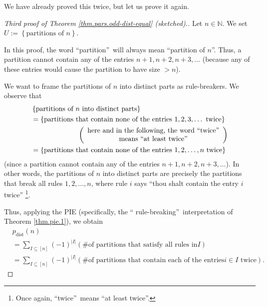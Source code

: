 We have already proved this twice, but let us prove it again.

\begin{proof}
[Third proof of Theorem \ref{thm.pars.odd-dist-equal} (sketched).]Let
$n\in\mathbb{N}$. We set $U:=\left\{  \text{partitions of }n\right\}  $.

In this proof, the word \textquotedblleft partition\textquotedblright\ will
always mean \textquotedblleft partition of $n$\textquotedblright. Thus, a
partition cannot contain any of the entries $n+1,n+2,n+3,\ldots$ (because any
of these entries would cause the partition to have size $>n$).

We want to frame the partitions of $n$ into distinct parts as rule-breakers.
We observe that%
\begin{align*}
&  \left\{  \text{partitions of }n\text{ into distinct parts}\right\} \\
&  =\left\{  \text{partitions that contain none of the entries }%
1,2,3,\ldots\text{ twice}\right\} \\
&  \ \ \ \ \ \ \ \ \ \ \ \ \ \ \ \ \ \ \ \ \left(
\begin{array}
[c]{c}%
\text{here and in the following, the word \textquotedblleft
twice\textquotedblright}\\
\text{means \textquotedblleft at least twice\textquotedblright}%
\end{array}
\right) \\
&  =\left\{  \text{partitions that contain none of the entries }%
1,2,\ldots,n\text{ twice}\right\}
\end{align*}
(since a partition cannot contain any of the entries $n+1,n+2,n+3,\ldots$). In
other words, the partitions of $n$ into distinct parts are precisely the
partitions that break all rules $1,2,\ldots,n$, where rule $i$ says
\textquotedblleft thou shalt contain the entry $i$ twice\textquotedblright%
\footnote{Once again, \textquotedblleft twice\textquotedblright\ means
\textquotedblleft at least twice\textquotedblright.}.

Thus, applying the PIE (specifically, the \textquotedblleft
rule-breaking\textquotedblright\ interpretation of Theorem \ref{thm.pie.1}),
we obtain%
\begin{align}
&  p_{\operatorname*{dist}}\left(  n\right) \nonumber\\
&  =\sum_{I\subseteq\left[  n\right]  }\left(  -1\right)  ^{\left\vert
I\right\vert }\left(  \text{\# of partitions that satisfy all rules in
}I\right) \nonumber\\
&  =\sum_{I\subseteq\left[  n\right]  }\left(  -1\right)  ^{\left\vert
I\right\vert }\left(  \text{\# of partitions that contain each of the entries
}i\in I\text{ twice}\right)  . \label{pf.thm.pars.odd-dist-equal.3rd.3}%
\end{align}



\end{proof}
